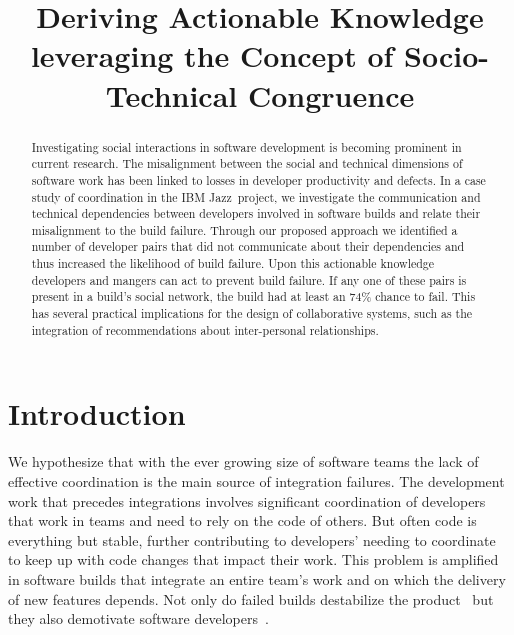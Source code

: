\documentclass[conference]{IEEEtran}
\begin{document}
\title{Deriving Actionable Knowledge leveraging the Concept of Socio-Technical Congruence}



\author{
\and
{}
}

\maketitle


\begin{abstract}
Investigating social interactions in software development is becoming 
prominent in current research. The misalignment
between the social and technical dimensions of software work has been
linked to losses in developer productivity and defects. In a case study of
coordination in the IBM Jazz\texttrademark\ project, we investigate the
communication and technical dependencies between developers involved in
software builds and relate their misalignment to the build failure.  
Through our proposed approach we identified a number of developer pairs that did not communicate about their dependencies and thus increased the likelihood of build failure. 
Upon this actionable knowledge developers and mangers can act to prevent build failure. 
If any one of these pairs is present in a build's social network, the build had at least an 74\% chance to fail. 
This has several practical implications for the design of collaborative systems, such as the integration of recommendations about inter-personal relationships.
\end{abstract}


\IEEEpeerreviewmaketitle

\section{Introduction}
We hypothesize that with the ever growing size of software teams the lack of
effective coordination is the main source of integration failures. The
development work that precedes integrations involves significant coordination of
developers that work in teams and need to rely on the code of others. 
But often code is everything but stable, further contributing to
developers' needing to coordinate to keep up with code changes that impact their work. This problem is
amplified in software builds that integrate an entire team's work
and on which the delivery of new features depends. Not only do
failed builds destabilize the product~\cite{cusumano1997} but they also demotivate
software developers~\cite{holck2004}.
\end{document}
